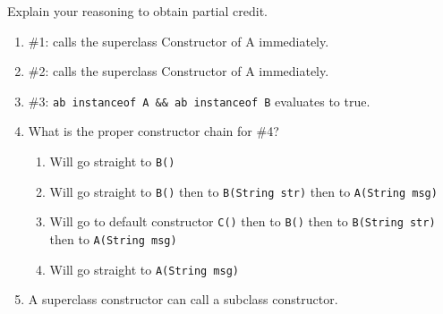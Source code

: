 \Instructions 
  Explain your reasoning to obtain partial credit.
\begin{enumerate}

Consider the following code for questions 1, 2, 3 and 4
\begin{lstlisting}
class A {
	public A(String msg) { }
}

class B extends A {
	public B() {
		this("Hello World"); /* #1 */
	}

	public B(String str) {
		super(str); /* #2 */
	}
}

class C extends B {
}

class Main {
	public static void main(String[] args) {
		A ab = new B(); /* #3 */
		C c = new C(); /* #4 */
	}
}
\end{lstlisting}

\item {} \tf \#1: calls the superclass Constructor of A immediately.
\vspace{2em}
\item {} \tf \#2: calls the superclass Constructor of A immediately.

\vspace{2em}
\item {} \tf \#3: \texttt{ab instanceof A \&\& ab instanceof B} evaluates to true.

\vspace{2em}
\item {} What is the proper constructor chain for \#4?
\begin{enumerate}
\item Will go straight to \texttt{B()}
\item Will go straight to \texttt{B()} then to \texttt{B(String str)} then to \texttt{A(String msg)}
\item Will go to default constructor \texttt{C()} then to \texttt{B()} then to \texttt{B(String str)} then to \texttt{A(String msg)}
\item Will go straight to \texttt{A(String msg)}
\end{enumerate}

\vspace{2em}
\item {} \tf A superclass constructor can call a subclass constructor.




\end{enumerate}  